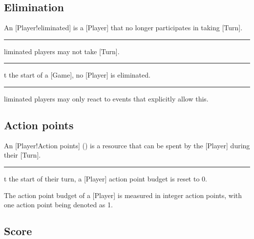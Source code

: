 
\subsection{Elimination}

An [Player!eliminated] is a [Player] that no longer participates in taking [Turn].

\begin{rules}
    \rule{player.elimination} Eliminated players may not take [Turn].
    \rule{player.elimination.init} At the start of a [Game], no [Player] is eliminated.
    \rule{player.elimination.react} Eliminated players may only react to events that explicitly allow this.
\end{rules}

\subsection{Action points}

An [Player!Action points] (\AP{}) is a resource that can be spent by the [Player] during their [Turn].

\begin{rules}
    \rule{player.actionpoints.init} At the start of their turn, a [Player] action point budget is reset to \(0\).
\end{rules}

The action point budget of a [Player] is measured in integer action points, with one action point being denoted as \SI{1}{\actionpoints{}}.

\subsection{Score}

